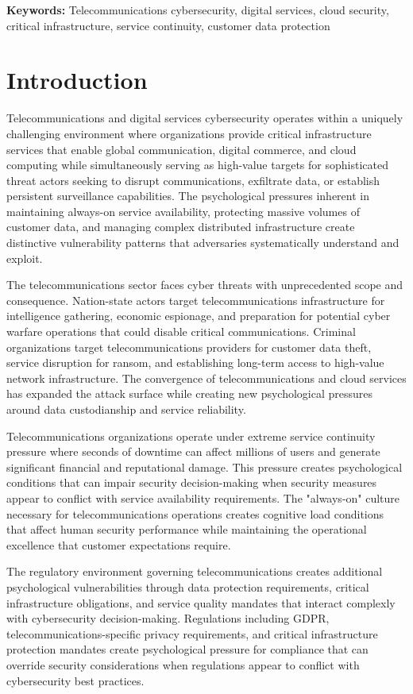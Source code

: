 \documentclass[10pt, twocolumn]{article}
\begin{document}
\textbf{Keywords:} Telecommunications cybersecurity, digital services, cloud security, critical infrastructure, service continuity, customer data protection

\section{Introduction}

Telecommunications and digital services cybersecurity operates within a uniquely challenging environment where organizations provide critical infrastructure services that enable global communication, digital commerce, and cloud computing while simultaneously serving as high-value targets for sophisticated threat actors seeking to disrupt communications, exfiltrate data, or establish persistent surveillance capabilities. The psychological pressures inherent in maintaining always-on service availability, protecting massive volumes of customer data, and managing complex distributed infrastructure create distinctive vulnerability patterns that adversaries systematically understand and exploit.

The telecommunications sector faces cyber threats with unprecedented scope and consequence. Nation-state actors target telecommunications infrastructure for intelligence gathering, economic espionage, and preparation for potential cyber warfare operations that could disable critical communications. Criminal organizations target telecommunications providers for customer data theft, service disruption for ransom, and establishing long-term access to high-value network infrastructure. The convergence of telecommunications and cloud services has expanded the attack surface while creating new psychological pressures around data custodianship and service reliability.

Telecommunications organizations operate under extreme service continuity pressure where seconds of downtime can affect millions of users and generate significant financial and reputational damage. This pressure creates psychological conditions that can impair security decision-making when security measures appear to conflict with service availability requirements. The "always-on" culture necessary for telecommunications operations creates cognitive load conditions that affect human security performance while maintaining the operational excellence that customer expectations require.

The regulatory environment governing telecommunications creates additional psychological vulnerabilities through data protection requirements, critical infrastructure obligations, and service quality mandates that interact complexly with cybersecurity decision-making. Regulations including GDPR, telecommunications-specific privacy requirements, and critical infrastructure protection mandates create psychological pressure for compliance that can override security considerations when regulations appear to conflict with cybersecurity best practices.
\end{document}
